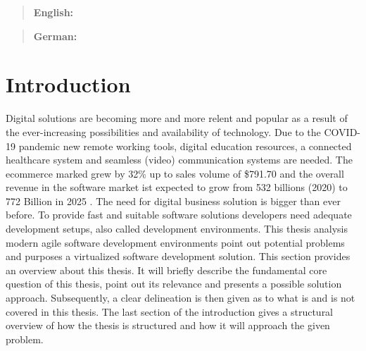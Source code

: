 \documentclass[12pt, a4paper]{article}
\begin{document}

\newpage\null\thispagestyle{empty}\newpage

\maketitle
\begin{abstract}
    \textbf{English:} \lipsum[20]
\end{abstract}
\begin{abstract}
    \textbf{German:} \lipsum[20]
\end{abstract}
\newpage

\tableofcontents
\newpage

\setcounter{lastroman}{\value{page}}


\section{Introduction}\label{sec::intro}
Digital solutions are becoming more and more relent and popular as a result of the ever-increasing possibilities and availability of technology. Due to the COVID-19 pandemic new remote working tools, digital education resources, a connected healthcare system and seamless (video) communication systems are needed. The ecommerce marked grew by 32\% up to sales volume of \$791.70 \cite{online_shopping_inc} and the overall revenue in the software market ist expected to grow from 532 billions (2020) to 772 Billion in 2025 \cite{software_industry_groth}. The need for digital business solution is bigger than ever before. To provide fast and suitable software solutions developers need adequate development setups, also called development environments. This thesis analysis modern agile software development environments point out potential problems and purposes a virtualized software development solution.\newline
This section provides an overview about this thesis. It will briefly describe the fundamental core question of this thesis, point out its relevance and presents a possible solution approach. Subsequently, a clear delineation is then given as to what is and is not covered in this thesis. The last section of the introduction gives a structural overview of how the thesis is structured and how it will approach the given problem.
\end{document}
